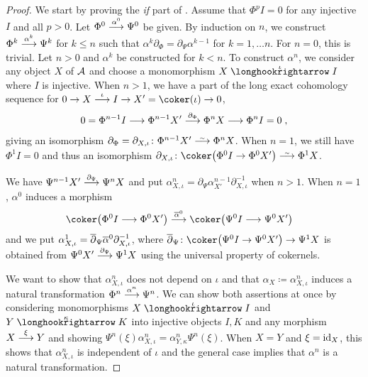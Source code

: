\documentclass[a4paper,parskip=half,numbers=enddot, DIV=12]{scrreprt}
\begin{document}
\begin{proof}
	We start by proving the \emph{if} part of . Assume that $\Phi^pI=0$ for any injective $I$ and all $p>0$. Let $\Phi^0\morphism[\alpha^0]\Psi^0$ be given. By induction on $n$, we construct $\Phi^k\morphism[\alpha^k]\Psi^k$ for $k\leq n$ such that $\alpha^k\partial_\Phi=\partial_\Psi\alpha^{k-1}$ for $k=1,\ldots n$. For $ n=0$, this is trivial. Let $ n>0$ and $\alpha^k$ be constructed for $k< n$. To construct $\alpha^ n$, we consider any object $X$ of $\mathcal{A}$ and choose a monomorphism $X\monomorphism[\iota]I$ where $I$ is injective. When $ n>1$, we have a part of the long exact cohomology sequence for $0\morphism X\morphism[\iota]I\morphism X'=\coker(\iota)\morphism 0$,
	\begin{align*}
		0=\Phi^{ n-1}I\morphism\Phi^{ n-1}X'\morphism[\partial_\Phi]\Phi^ n X\morphism\Phi^ n I=0\;,
	\end{align*}
	giving an isomorphism $\partial_\Phi=\partial_{X,\iota}\colon\Phi^{ n-1}X'\isomorphism\Phi^ n X$. When $ n=1$, we still have $\Phi^1I=0$ and thus an isomorphism $\partial_{X,\iota}\colon\coker\big(\Phi^0I\morphism\Phi^0X'\big)\isomorphism\Phi^1X$. 
	
	We have $\Psi^{ n-1}X'\morphism[\partial_\Psi]\Psi^ n X$ and put $\alpha_{X,\iota}^ n=\partial_\Psi\alpha_{X'}^{n-1}\partial_{X,\iota}^{-1}$ when $ n>1$. When $ n=1$, $\alpha^0$ induces a morphism
	\begin{align*}
		\coker\big(\Phi^0I\morphism\Phi^0X'\big)&\morphism[\ov{\alpha}^0]\coker\big(\Psi^0I\morphism\Psi^0X'\big)
	\end{align*}
	and we put $\alpha_{X,\iota}^1=\overline{\partial}_\Psi\overline{\alpha}^0\partial_{X,\iota}^{-1}$, where $\ov{\partial}_\Psi\colon \coker\big(\Psi^0I\morphism\Psi^0X'\big)\morphism\Psi^1X$ is obtained from $\Psi^0X'\morphism[\smash{\partial_\Psi}]\Psi^1X$ using the universal property of cokernels.
	
	We want to show that $\alpha_{X,\iota}^ n$ does not depend on $\iota$ and that $\alpha_X\coloneqq \alpha_{X,\iota}^n$ induces a natural transformation $\Phi^n\morphism[\alpha\smash{^n}]\Psi^n$. We can show both assertions at once by considering monomorphisms $X\monomorphism[\iota]I$ and $Y\monomorphism[\kappa]K$ into injective objects $I,K$ and any morphism $X\morphism[\xi]Y$ and showing $\Psi^n(\xi)\alpha_{X,\iota}^n=\alpha_{Y,\kappa}^n\Psi^n(\xi)$. When $X=Y$ and $\xi=\operatorname{id}_X$, this shows that $\alpha_{X,\iota}^n$ is independent of $\iota$ and the general case implies that $\alpha^n$ is a natural transformation. 
	

\end{proof}
\end{document}
